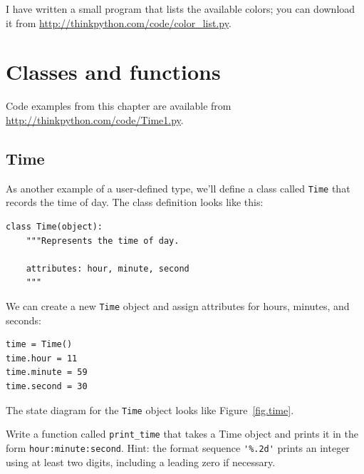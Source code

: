 \documentclass[10pt]{book}
\begin{document}
\begin{CJK}{UTF8}{gbsn}
\begin{exercise}
\begin{enumerate}
\end{enumerate}

I have written a small program that lists the available colors;
you can download it from \url{http://thinkpython.com/code/color_list.py}.

\end{exercise}


\chapter{Classes and functions}
\label{time}

Code examples from this chapter are available from
\url{http://thinkpython.com/code/Time1.py}.

\section{Time}
\label{time.object}

As another example of a user-defined type, we'll define a class called
{\tt Time} that records the time of day.  The class definition looks
like this:

\begin{verbatim}
class Time(object):
    """Represents the time of day.
       
    attributes: hour, minute, second
    """
\end{verbatim}
%
We can create a new {\tt Time} object and assign
attributes for hours, minutes, and seconds:

\begin{verbatim}
time = Time()
time.hour = 11
time.minute = 59
time.second = 30
\end{verbatim}
%
The state diagram for the {\tt Time} object looks like Figure~\ref{fig.time}.

\begin{exercise}
\label{ex.printtime}

Write a function called \verb"print_time" that takes a 
Time object and prints it in the form {\tt hour:minute:second}.
Hint: the format sequence \verb"'%.2d'" prints an integer using
at least two digits, including a leading zero if necessary.

\end{exercise}

\begin{exercise}
\label{isafter}


\end{exercise}
\end{CJK}
\end{document}
